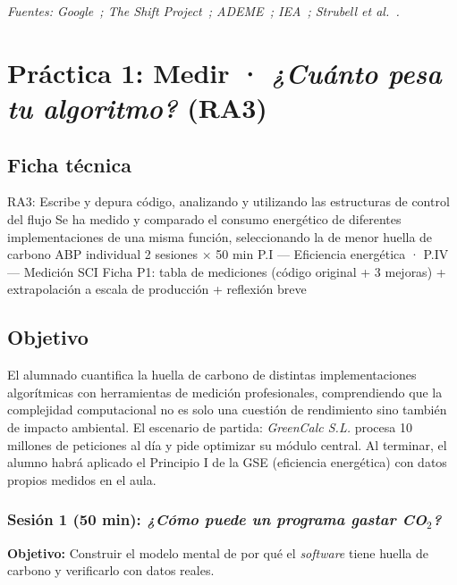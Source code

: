 \textit{Fuentes: Google~\cite{google2022environmental}; The Shift Project~\cite{shiftproject2019lean}; ADEME~\cite{ademe2022face}; IEA~\cite{iea2024energy}; Strubell et al.~\cite{strubell2019energy}.}






\section{Práctica 1: Medir · \textit{¿Cuánto pesa tu algoritmo?} (RA3)}


\subsection{Ficha técnica}


  {RA3: Escribe y depura código, analizando y utilizando las estructuras de control del flujo}
  {Se ha medido y comparado el consumo energético de diferentes implementaciones de una misma función, seleccionando la de menor huella de carbono}
  {ABP individual}
  {2 sesiones $\times$ 50 min}
  {P.I — Eficiencia energética · P.IV — Medición SCI}
  {Ficha P1: tabla de mediciones (código original + 3 mejoras) + extrapolación a escala de producción + reflexión breve}


\subsection{Objetivo}


El alumnado cuantifica la huella de carbono de distintas implementaciones algorítmicas con herramientas de medición profesionales, comprendiendo que la complejidad computacional no es solo una cuestión de rendimiento sino también de impacto ambiental. El escenario de partida: \textit{GreenCalc S.L.} procesa 10 millones de peticiones al día y pide optimizar su módulo central. Al terminar, el alumno habrá aplicado el Principio I de la GSE (eficiencia energética) con datos propios medidos en el aula.


\subsubsection{Sesión 1 (50 min): \textit{¿Cómo puede un programa gastar CO$_2$?}}


\textbf{Objetivo:} Construir el modelo mental de por qué el \textit{software} tiene huella de carbono y verificarlo con datos reales.


